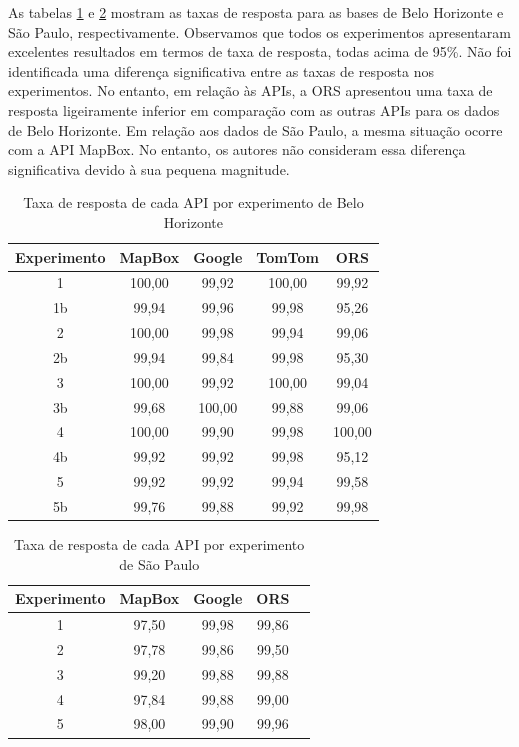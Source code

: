 As tabelas \ref{tab:txRespExpAPIBH} e \ref{tab:txRespExpAPISP} mostram as taxas de resposta para as bases de Belo Horizonte e São Paulo, respectivamente. Observamos que todos os experimentos apresentaram excelentes resultados em termos de taxa de resposta, todas acima de 95\%. Não foi identificada uma diferença significativa entre as taxas de resposta nos experimentos. No entanto, em relação às APIs, a ORS apresentou uma taxa de resposta ligeiramente inferior em comparação com as outras APIs para os dados de Belo Horizonte. Em relação aos dados de São Paulo, a mesma situação ocorre com a API MapBox. No entanto, os autores não consideram essa diferença significativa devido à sua pequena magnitude.
 
\begin{table}[!ht]
\centering
\caption{Taxa de resposta de cada API por experimento de Belo Horizonte}
\label{tab:txRespExpAPIBH}
\begin{adjustbox}{width=0.7\textwidth}
\begin{tabular}{|c|c|c|c|c|}
\hline
Experimento & MapBox & Google & TomTom & ORS\\
\hline
1 & 100,00 & 99,92 & 100,00 & 99,92\\
\hline
1b & 99,94 & 99,96 & 99,98 & 95,26 \\
\hline
2 & 100,00 & 99,98 & 99,94 & 99,06\\
\hline
2b & 99,94 & 99,84 & 99,98 & 95,30\\
\hline
3 & 100,00 & 99,92 & 100,00 & 99,04\\
\hline
3b & 99,68 & 100,00 & 99,88 & 99,06\\
\hline
4 & 100,00 & 99,90 & 99,98 & 100,00\\
\hline
4b & 99,92 & 99,92 & 99,98 & 95,12\\
\hline
5 & 99,92 & 99,92 & 99,94 & 99,58\\
\hline
5b & 99,76 & 99,88 & 99,92 & 99,98\\
\hline
\end{tabular}
\end{adjustbox}
\end{table}

\begin{table}[!ht]
\centering
\caption{Taxa de resposta de cada API por experimento de São Paulo}
\label{tab:txRespExpAPISP}
\begin{adjustbox}{width=0.7\textwidth}
\begin{tabular}{|c|c|c|c|c|}
\hline
Experimento & MapBox & Google & ORS\\
\hline
1 & 97,50 & 99,98 & 99,86 \\
\hline
2 & 97,78 & 99,86 & 99,50 \\
\hline
3 & 99,20 & 99,88 & 99,88 \\
\hline
4 & 97,84 & 99,88 & 99,00 \\
\hline
5 & 98,00 & 99,90 & 99,96 \\
\hline
\end{tabular}
\end{adjustbox}
\end{table}


